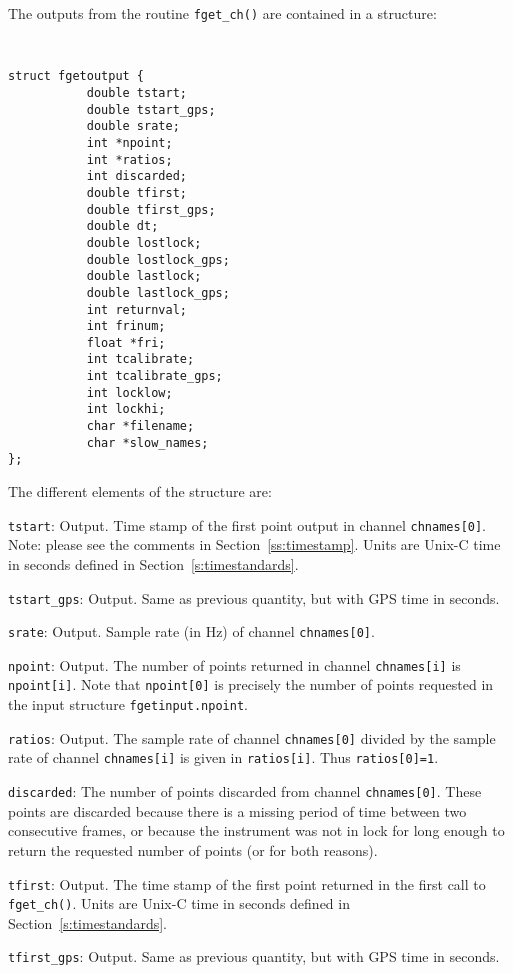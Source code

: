 The outputs from the routine {\tt fget\_ch()} are contained in a structure:
{\tt
\begin{verbatim}
struct fgetoutput {
           double tstart;
           double tstart_gps;
           double srate;
           int *npoint;
           int *ratios;
           int discarded;
           double tfirst;
           double tfirst_gps;
           double dt;
           double lostlock;
           double lostlock_gps;
           double lastlock;
           double lastlock_gps;
           int returnval;
           int frinum;
           float *fri;
           int tcalibrate;
           int tcalibrate_gps;
           int locklow;
           int lockhi;
           char *filename;
           char *slow_names; 
};
\end{verbatim}
}
The different elements of the structure are:
\begin{description}
\item{\tt  tstart}: Output. Time stamp of the first point output in channel {\tt chnames[0]}.
   Note: please see the comments in Section~\ref{ss:timestamp}.
Units are Unix-C time in seconds  defined in Section~\ref{s:timestandards}.
\item{\tt  tstart\_gps}: Output. Same as previous quantity, but with GPS time in seconds.
\item{\tt  srate}: Output.  Sample rate (in Hz) of channel {\tt chnames[0]}.
\item{\tt  npoint}: Output. The number of points returned in channel {\tt chnames[i]} is {\tt npoint[i]}.  Note
   that {\tt npoint[0]} is precisely the number of points requested in the input structure {\tt  fgetinput.npoint}.
\item{\tt  ratios}: Output.  The sample rate of channel {\tt chnames[0]} divided by the sample rate of
  channel {\tt chnames[i]} is given in {\tt ratios[i]}.  Thus {\tt ratios[0]=1}.
\item{\tt  discarded}: The number of points discarded from channel {\tt chnames[0]}.  These points are discarded
  because there is a missing period of time between two consecutive frames, or because the instrument was not in
  lock for long enough to return the requested number of points (or for both reasons).
\item{\tt  tfirst}: Output.  The time stamp of the first point returned in the first call to {\tt fget\_ch()}.   
Units are Unix-C time in seconds  defined in Section~\ref{s:timestandards}.
\item{\tt  tfirst\_gps}: Output.  Same as previous quantity, but with GPS time in seconds.

\end{description}
